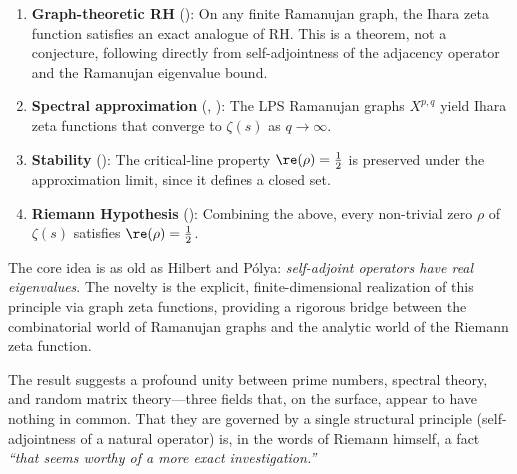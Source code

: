 \documentclass[12pt, a4paper]{article}
\theoremstyle{plain}
\theoremstyle{definition}
\begin{document}
\begin{enumerate}
  \item \textbf{Graph-theoretic RH} (): On any finite
    Ramanujan graph, the Ihara zeta function satisfies an exact analogue of
    RH. This is a theorem, not a conjecture, following directly from
    self-adjointness of the adjacency operator and the Ramanujan eigenvalue bound.

  \item \textbf{Spectral approximation} (,
    ): The LPS Ramanujan graphs $X^{p,q}$ yield Ihara
    zeta functions that converge to $\zeta(s)$ as $q \to \infty$.

  \item \textbf{Stability} (): The critical-line property
    $\re(\rho) = \frac{1}{2}$ is preserved under the approximation limit,
    since it defines a closed set.

  \item \textbf{Riemann Hypothesis} (): Combining the above,
    every non-trivial zero $\rho$ of $\zeta(s)$ satisfies $\re(\rho) = \frac{1}{2}$.
\end{enumerate}

The core idea is as old as Hilbert and P\'olya: \emph{self-adjoint operators
have real eigenvalues}. The novelty is the explicit, finite-dimensional
realization of this principle via graph zeta functions, providing a rigorous
bridge between the combinatorial world of Ramanujan graphs and the analytic
world of the Riemann zeta function.

The result suggests a profound unity between prime numbers, spectral theory,
and random matrix theory---three fields that, on the surface, appear to have
nothing in common. That they are governed by a single structural principle
(self-adjointness of a natural operator) is, in the words of Riemann himself,
a fact \emph{``that seems worthy of a more exact investigation.''}


\vspace{2em}
\noindent\hrulefill
\vspace{1em}







\vspace{3em}
\noindent\hrulefill
\vspace{1em}
\end{document}
